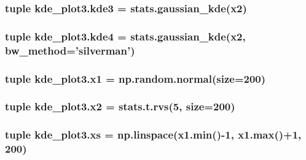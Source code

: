 \subsubsection[{kde3}]{\setlength{\rightskip}{0pt plus 5cm}tuple kde\+\_\+plot3.\+kde3 = stats.\+gaussian\+\_\+kde({\bf x2})}\label{namespacekde__plot3_a6dcf138f4a61bb8402a2533abea1de40}
\hypertarget{namespacekde__plot3_aec3aad5f83254bf1196b6ee3e0d9720e}{}
\subsubsection[{kde4}]{\setlength{\rightskip}{0pt plus 5cm}tuple kde\+\_\+plot3.\+kde4 = stats.\+gaussian\+\_\+kde({\bf x2}, bw\+\_\+method='silverman')}\label{namespacekde__plot3_aec3aad5f83254bf1196b6ee3e0d9720e}
\hypertarget{namespacekde__plot3_a47b4fbdfb27208bb6d4f3a0f0963b9e3}{}
\subsubsection[{x1}]{\setlength{\rightskip}{0pt plus 5cm}tuple kde\+\_\+plot3.\+x1 = np.\+random.\+normal(size=200)}\label{namespacekde__plot3_a47b4fbdfb27208bb6d4f3a0f0963b9e3}
\hypertarget{namespacekde__plot3_ad482b5dee3dc21bce5fabc6ece7e9d96}{}
\subsubsection[{x2}]{\setlength{\rightskip}{0pt plus 5cm}tuple kde\+\_\+plot3.\+x2 = stats.\+t.\+rvs(5, size=200)}\label{namespacekde__plot3_ad482b5dee3dc21bce5fabc6ece7e9d96}
\hypertarget{namespacekde__plot3_a379d691198eaa6313ae4e5158b5d6b79}{}
\subsubsection[{xs}]{\setlength{\rightskip}{0pt plus 5cm}tuple kde\+\_\+plot3.\+xs = np.\+linspace({\bf x1.\+min}()-\/1, {\bf x1.\+max}()+1, 200)}\label{namespacekde__plot3_a379d691198eaa6313ae4e5158b5d6b79}
